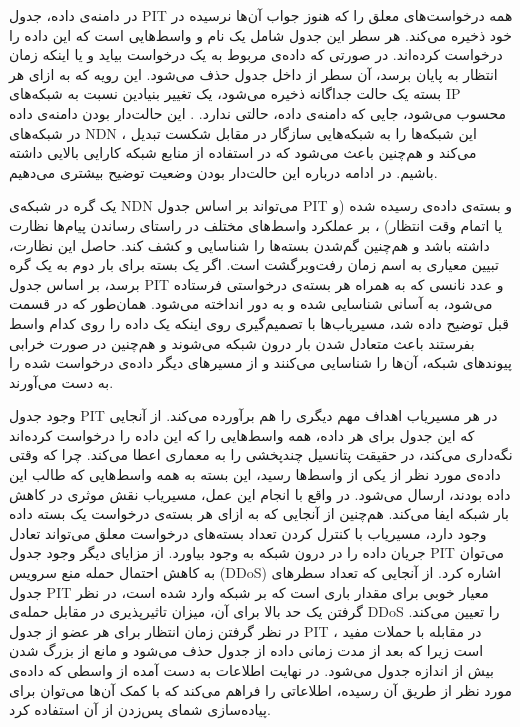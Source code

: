 در دامنه‌ی داده، جدول PIT همه درخواست‌های معلق را که هنوز جواب آن‌ها نرسیده در خود ذخیره می‌کند. هر سطر این جدول شامل یک نام و واسط‌هایی است که این داده را درخواست کرده‌اند. در صورتی که داده‌ی مربوط به یک درخواست بیاید و یا اینکه زمان انتظار به پایان برسد، آن سطر از داخل جدول حذف می‌شود. این رویه که به ازای هر بسته یک حالت جداگانه ذخیره می‌شود، یک تغییر بنیادین نسبت به شبکه‌های IP محسوب می‌شود، جایی که دامنه‌ی داده، حالتی ندارد.    . این حالت‌دار بودن دامنه‌ی داده در شبکه‌های NDN ، این شبکه‌ها را به شبکه‌هایی سازگار در مقابل شکست‌ تبدیل می‌کند و هم‌چنین باعث می‌شود که در استفاده از منابع شبکه کارایی بالایی داشته باشیم. در ادامه درباره این حالت‌دار بودن وضعیت توضیح بیشتری می‌دهیم. 

 یک گره در شبکه‌ی NDN  می‌تواند بر اساس جدول PIT و بسته‌ی داده‌ی رسیده شده (‌و یا اتمام وقت انتظار) ،  بر عملکرد واسط‌های مختلف در راستای رساندن پیام‌ها نظارت داشته باشد و هم‌چنین گم‌شدن بسته‌ها را شناسایی و کشف کند. حاصل این نظارت، تبیین معیاری به اسم زمان رفت‌وبرگشت است. اگر یک بسته برای بار دوم به یک گره برسد،   بر اساس جدول PIT  و عدد نانسی که به همراه هر بسته‌ی درخواستی فرستاده می‌شود، به آسانی شناسایی شده و به دور انداخته می‌شود. همان‌طور که در قسمت قبل توضیح داده‌ شد، مسیریاب‌ها با تصمیم‌گیری روی اینکه یک داده را روی کدام واسط بفرستند باعث متعادل شدن بار درون شبکه می‌شوند و هم‌چنین در صورت خرابی پیوندهای شبکه، آن‌ها را شناسایی می‌کنند و از مسیرهای دیگر داده‌ی درخواست شده را به دست می‌آورند. 
 
وجود جدول PIT  در هر مسیریاب اهداف مهم دیگری را هم برآورده می‌کند. از آنجایی که این جدول برای هر داده، همه واسط‌هایی را  که این داده را درخواست کرده‌اند نگه‌داری می‌کند، در حقیقت پتانسیل چندپخشی را به معماری اعطا می‌کند. چرا که وقتی داده‌ی مورد نظر از یکی از واسط‌ها رسید، این بسته به همه واسط‌هایی که طالب این داده بودند، ارسال می‌شود. در واقع با انجام این عمل، مسیریاب نقش موثری در کاهش بار شبکه ایفا می‌کند. هم‌چنین از آنجایی که به ازای هر بسته‌ی درخواست یک بسته داده وجود دارد، مسیریاب با کنترل کردن تعداد بسته‌های درخواست معلق می‌تواند تعادل جریان داده را در درون شبکه به وجود بیاورد.  از مزایای دیگر وجود جدول PIT می‌توان به کاهش احتمال حمله منع سرویس 
(DDoS)
 اشاره کرد. از آنجایی که تعداد سطر‌های جدول PIT  معیار خوبی برای مقدار باری است که بر شبکه وارد شده است، در نظر گرفتن یک حد بالا برای آن، میزان تاثیرپذیری در مقابل حمله‌ی DDoS را تعیین می‌کند. در نظر گرفتن زمان انتظار برای هر عضو از جدول PIT ، در مقابله با حملات مفید‌ است زیرا که بعد از مدت زمانی داده از جدول حذف می‌شود و مانع از بزرگ شدن بیش از اندازه جدول می‌شود.
\cite{lads}
در نهایت اطلاعات به‌ دست آمده از واسطی که داده‌ی مورد نظر از طریق آن رسیده، اطلاعاتی را فراهم می‌کند که با کمک آن‌‌ها می‌توان برای  پیاده‌سازی شمای پس‌زدن
\cite{pushback}
 از آن استفاده کرد. 
